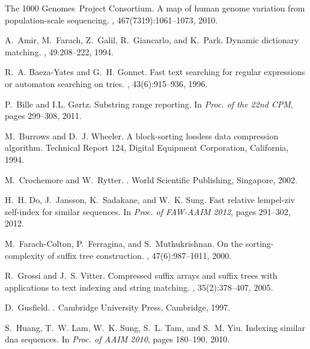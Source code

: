 \documentclass{llncs}
\begin{document}
\begin{thebibliography}{10}

The 1000 Genomes~Project Consortium.
\newblock A map of human genome variation from population-scale sequencing.
, 467(7319):1061--1073, 2010.

A.~Amir, M.~Farach, Z.~Galil, R.~Giancarlo, and K.~Park.
\newblock Dynamic dictionary matching.
, 49:208--222, 1994.

R.~A. Baeza-Yates and G.~H. Gonnet.
\newblock Fast text searching for regular expressions or automaton searching on
  tries.
, 43(6):915--936, 1996.

P.~Bille and I.L. G{\o}rtz.
\newblock Substring range reporting.
\newblock In {\em Proc. of the 22nd CPM}, pages 299--308, 2011.

M.~Burrows and D.~J. Wheeler.
\newblock A block-sorting lossless data compression algorithm.
\newblock Technical Report 124, Digital Equipment Corporation,
  California, 1994.

M.~Crochemore and W.~Rytter.
.
\newblock World Scientific Publishing, Singapore, 2002.

H.~H. Do, J.~Jansson, K.~Sadakane, and W.~K. Sung.
\newblock Fast relative lempel-ziv self-index for similar sequences.
\newblock In {\em Proc. of FAW-AAIM 2012}, pages 291--302, 2012.

M.~Farach-Colton, P.~Ferragina, and S.~Muthukrishnan.
\newblock On the sorting-complexity of suffix tree construction.
, 47(6):987--1011, 2000.

R.~Grossi and J.~S. Vitter.
\newblock Compressed suffix arrays and suffix trees with applications to text
  indexing and string matching.
, 35(2):378--407, 2005.

D.~Gusfield.
.
\newblock Cambridge University Press, Cambridge, 1997.

S.~Huang, T.~W. Lam, W.~K. Sung, S.~L. Tam, and S.~M. Yiu.
\newblock Indexing similar dna sequences.
\newblock In {\em Proc. of AAIM 2010}, pages 180--190, 2010.


\end{thebibliography}
\end{document}

